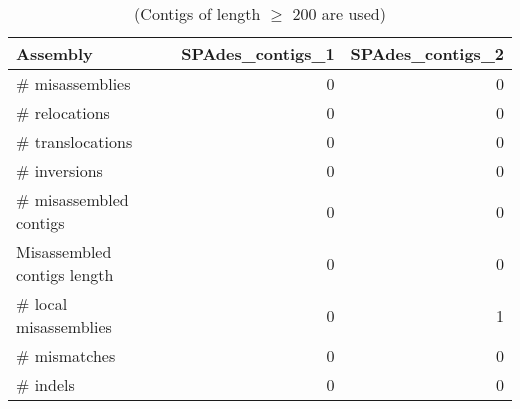 \begin{table}[ht]
\begin{center}
\caption{(Contigs of length $\geq$ 200 are used)}
\begin{tabular}{|l*{2}{|r}|}
\hline
Assembly & SPAdes\_contigs\_1 & SPAdes\_contigs\_2 \\ \hline
\# misassemblies & 0 & 0 \\ \hline
    \# relocations & 0 & 0 \\ \hline
    \# translocations & 0 & 0 \\ \hline
    \# inversions & 0 & 0 \\ \hline
\# misassembled contigs & 0 & 0 \\ \hline
Misassembled contigs length & 0 & 0 \\ \hline
\# local misassemblies & 0 & 1 \\ \hline
\# mismatches & 0 & 0 \\ \hline
\# indels & 0 & 0 \\ \hline
\end{tabular}
\end{center}
\end{table}

